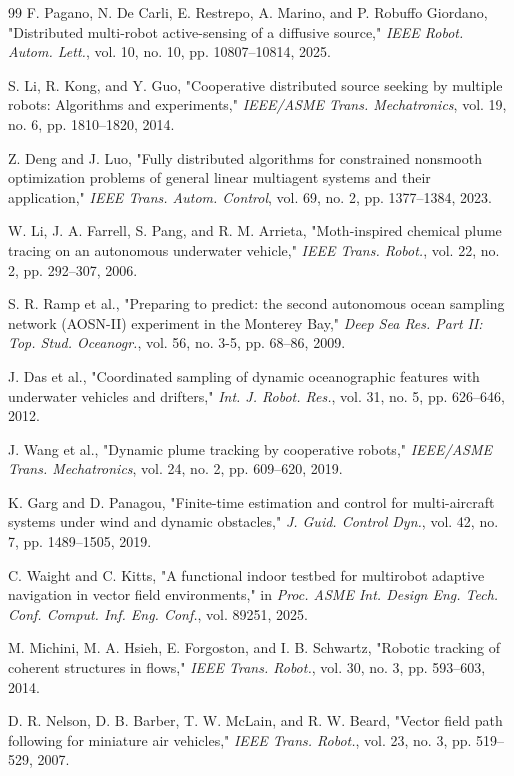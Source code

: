 \documentclass[lettersize,journal]{IEEEtran}
\begin{document}
\begin{thebibliography}{99}
 F. Pagano, N. De Carli, E. Restrepo, A. Marino, and P. Robuffo Giordano, "Distributed multi-robot active-sensing of a diffusive source," \textit{IEEE Robot. Autom. Lett.}, vol. 10, no. 10, pp. 10807--10814, 2025.

 S. Li, R. Kong, and Y. Guo, "Cooperative distributed source seeking by multiple robots: Algorithms and experiments," \textit{IEEE/ASME Trans. Mechatronics}, vol. 19, no. 6, pp. 1810--1820, 2014.

 Z. Deng and J. Luo, "Fully distributed algorithms for constrained nonsmooth optimization problems of general linear multiagent systems and their application," \textit{IEEE Trans. Autom. Control}, vol. 69, no. 2, pp. 1377--1384, 2023.

 W. Li, J. A. Farrell, S. Pang, and R. M. Arrieta, "Moth-inspired chemical plume tracing on an autonomous underwater vehicle," \textit{IEEE Trans. Robot.}, vol. 22, no. 2, pp. 292--307, 2006.

 S. R. Ramp et al., "Preparing to predict: the second autonomous ocean sampling network (AOSN-II) experiment in the Monterey Bay," \textit{Deep Sea Res. Part II: Top. Stud. Oceanogr.}, vol. 56, no. 3-5, pp. 68--86, 2009.

 J. Das et al., "Coordinated sampling of dynamic oceanographic features with underwater vehicles and drifters," \textit{Int. J. Robot. Res.}, vol. 31, no. 5, pp. 626--646, 2012.

 J. Wang et al., "Dynamic plume tracking by cooperative robots," \textit{IEEE/ASME Trans. Mechatronics}, vol. 24, no. 2, pp. 609--620, 2019.

 K. Garg and D. Panagou, "Finite-time estimation and control for multi-aircraft systems under wind and dynamic obstacles," \textit{J. Guid. Control Dyn.}, vol. 42, no. 7, pp. 1489--1505, 2019.

 C. Waight and C. Kitts, "A functional indoor testbed for multirobot adaptive navigation in vector field environments," in \textit{Proc. ASME Int. Design Eng. Tech. Conf. Comput. Inf. Eng. Conf.}, vol. 89251, 2025.

 M. Michini, M. A. Hsieh, E. Forgoston, and I. B. Schwartz, "Robotic tracking of coherent structures in flows," \textit{IEEE Trans. Robot.}, vol. 30, no. 3, pp. 593--603, 2014.

 D. R. Nelson, D. B. Barber, T. W. McLain, and R. W. Beard, "Vector field path following for miniature air vehicles," \textit{IEEE Trans. Robot.}, vol. 23, no. 3, pp. 519--529, 2007.


\end{thebibliography}
\end{document}
